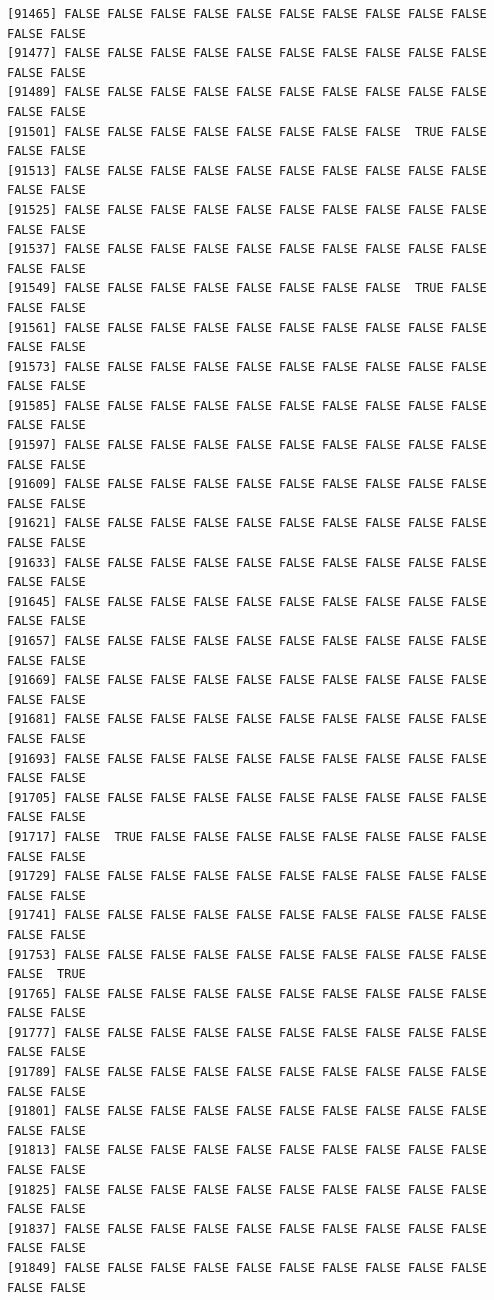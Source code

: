\documentclass[
  a4paper,
  DIV=11,
  numbers=noendperiod]{scrartcl}
\begin{document}
\begin{verbatim}
[91465] FALSE FALSE FALSE FALSE FALSE FALSE FALSE FALSE FALSE FALSE FALSE FALSE
[91477] FALSE FALSE FALSE FALSE FALSE FALSE FALSE FALSE FALSE FALSE FALSE FALSE
[91489] FALSE FALSE FALSE FALSE FALSE FALSE FALSE FALSE FALSE FALSE FALSE FALSE
[91501] FALSE FALSE FALSE FALSE FALSE FALSE FALSE FALSE  TRUE FALSE FALSE FALSE
[91513] FALSE FALSE FALSE FALSE FALSE FALSE FALSE FALSE FALSE FALSE FALSE FALSE
[91525] FALSE FALSE FALSE FALSE FALSE FALSE FALSE FALSE FALSE FALSE FALSE FALSE
[91537] FALSE FALSE FALSE FALSE FALSE FALSE FALSE FALSE FALSE FALSE FALSE FALSE
[91549] FALSE FALSE FALSE FALSE FALSE FALSE FALSE FALSE  TRUE FALSE FALSE FALSE
[91561] FALSE FALSE FALSE FALSE FALSE FALSE FALSE FALSE FALSE FALSE FALSE FALSE
[91573] FALSE FALSE FALSE FALSE FALSE FALSE FALSE FALSE FALSE FALSE FALSE FALSE
[91585] FALSE FALSE FALSE FALSE FALSE FALSE FALSE FALSE FALSE FALSE FALSE FALSE
[91597] FALSE FALSE FALSE FALSE FALSE FALSE FALSE FALSE FALSE FALSE FALSE FALSE
[91609] FALSE FALSE FALSE FALSE FALSE FALSE FALSE FALSE FALSE FALSE FALSE FALSE
[91621] FALSE FALSE FALSE FALSE FALSE FALSE FALSE FALSE FALSE FALSE FALSE FALSE
[91633] FALSE FALSE FALSE FALSE FALSE FALSE FALSE FALSE FALSE FALSE FALSE FALSE
[91645] FALSE FALSE FALSE FALSE FALSE FALSE FALSE FALSE FALSE FALSE FALSE FALSE
[91657] FALSE FALSE FALSE FALSE FALSE FALSE FALSE FALSE FALSE FALSE FALSE FALSE
[91669] FALSE FALSE FALSE FALSE FALSE FALSE FALSE FALSE FALSE FALSE FALSE FALSE
[91681] FALSE FALSE FALSE FALSE FALSE FALSE FALSE FALSE FALSE FALSE FALSE FALSE
[91693] FALSE FALSE FALSE FALSE FALSE FALSE FALSE FALSE FALSE FALSE FALSE FALSE
[91705] FALSE FALSE FALSE FALSE FALSE FALSE FALSE FALSE FALSE FALSE FALSE FALSE
[91717] FALSE  TRUE FALSE FALSE FALSE FALSE FALSE FALSE FALSE FALSE FALSE FALSE
[91729] FALSE FALSE FALSE FALSE FALSE FALSE FALSE FALSE FALSE FALSE FALSE FALSE
[91741] FALSE FALSE FALSE FALSE FALSE FALSE FALSE FALSE FALSE FALSE FALSE FALSE
[91753] FALSE FALSE FALSE FALSE FALSE FALSE FALSE FALSE FALSE FALSE FALSE  TRUE
[91765] FALSE FALSE FALSE FALSE FALSE FALSE FALSE FALSE FALSE FALSE FALSE FALSE
[91777] FALSE FALSE FALSE FALSE FALSE FALSE FALSE FALSE FALSE FALSE FALSE FALSE
[91789] FALSE FALSE FALSE FALSE FALSE FALSE FALSE FALSE FALSE FALSE FALSE FALSE
[91801] FALSE FALSE FALSE FALSE FALSE FALSE FALSE FALSE FALSE FALSE FALSE FALSE
[91813] FALSE FALSE FALSE FALSE FALSE FALSE FALSE FALSE FALSE FALSE FALSE FALSE
[91825] FALSE FALSE FALSE FALSE FALSE FALSE FALSE FALSE FALSE FALSE FALSE FALSE
[91837] FALSE FALSE FALSE FALSE FALSE FALSE FALSE FALSE FALSE FALSE FALSE FALSE
[91849] FALSE FALSE FALSE FALSE FALSE FALSE FALSE FALSE FALSE FALSE FALSE FALSE

\end{verbatim}
\end{document}

